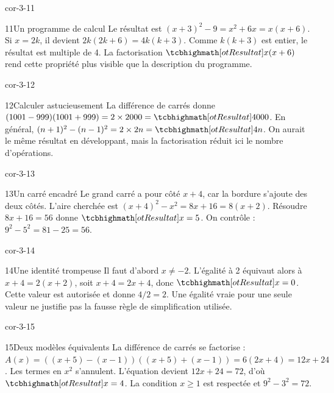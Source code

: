 \begin{blocLivre}{cor-3-11}
\begin{corrige}{11}{Un programme de calcul}
Le résultat est $(x+3)^2-9=x^2+6x=x(x+6)$. Si $x=2k$, il devient $2k(2k+6)=4k(k+3)$. Comme $k(k+3)$ est entier, le résultat est multiple de 4. La factorisation $\res{x(x+6)}$ rend cette propriété plus visible que la description du programme.
\end{corrige}
\end{blocLivre}
\begin{blocLivre}{cor-3-12}
\begin{corrige}{12}{Calculer astucieusement}
La différence de carrés donne $(1001-999)(1001+999)=2\times2000=\res{4000}$. En général, $(n+1)^2-(n-1)^2=2\times2n=\res{4n}$. On aurait le même résultat en développant, mais la factorisation réduit ici le nombre d’opérations.
\end{corrige}
\end{blocLivre}
\begin{blocLivre}{cor-3-13}
\begin{corrige}{13}{Un carré encadré}
Le grand carré a pour côté $x+4$, car la bordure s’ajoute des deux côtés. L’aire cherchée est $(x+4)^2-x^2=8x+16=8(x+2)$. Résoudre $8x+16=56$ donne $\res{x=5}$. On contrôle : $9^2-5^2=81-25=56$.
\label{fig-cor-3-13}
\end{corrige}
\end{blocLivre}
\begin{blocLivre}{cor-3-14}
\begin{corrige}{14}{Une identité trompeuse}
Il faut d’abord $x\ne-2$. L’égalité à 2 équivaut alors à $x+4=2(x+2)$, soit $x+4=2x+4$, donc $\res{x=0}$. Cette valeur est autorisée et donne $4/2=2$. Une égalité vraie pour une seule valeur ne justifie pas la fausse règle de simplification utilisée.
\end{corrige}
\end{blocLivre}
\begin{blocLivre}{cor-3-15}
\begin{corrige}{15}{Deux modèles équivalents}
La différence de carrés se factorise : $A(x)=((x+5)-(x-1))((x+5)+(x-1))=6(2x+4)=12x+24$. Les termes en $x^2$ s’annulent. L’équation devient $12x+24=72$, d’où $\res{x=4}$. La condition $x\ge1$ est respectée et $9^2-3^2=72$.
\end{corrige}
\end{blocLivre}
